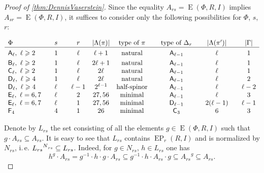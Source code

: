 \documentclass[oneside, 12pt]{amsart}
\theoremstyle{plain}
\numberwithin{equation}{section}
\numberwithin{lemma}{section}
\theoremstyle{definition}
\theoremstyle{remark}
\DeclareMathOperator{\E}{E}
\DeclareMathOperator{\EP}{EP}
\newcommand{\rA}{\mathsf{A}}
\newcommand{\rB}{\mathsf{B}}
\newcommand{\rC}{\mathsf{C}}
\newcommand{\rD}{\mathsf{D}}
\newcommand{\rE}{\mathsf{E}}
\newcommand{\rF}{\mathsf{F}}
\def\ssub#1{\mathchoice
   {_{\lower2pt\hbox{$\scriptstyle #1$}}}
   {_{\lower2pt\hbox{$\scriptstyle #1$}}}
   {_{\lower1.5pt\hbox{$\scriptscriptstyle #1$}}}
   {_{\!\lower1.5pt\hbox{$\scriptscriptstyle #1$}}}}
\begin{document}
\begin{proof}[Proof of \cref{thm:DennisVaserstein}]
Since the equality $A_{rs} = \E(\Phi, R, I)$ implies $A_{sr} = \E(\Phi, R, I)$, it suffices to consider only the following possibilities for $\Phi$, $s$, $r$:
\begin{table}[htb]
\[\begin{array}{l @{\qquad} l @{\qquad} c @{\quad} c @{\quad} c @{\qquad} c @{\qquad} c @{\qquad} c}
\Phi                                 & s    &r      & |\Lambda(\pi)| & \text{type of $\pi$} & \text{type of $\Delta_r$} & |\Lambda(\pi')|& |\Gamma|  \\ \hline\vphantom{\Bigl(}
\rA_\ell, \ \ell\geqslant 2           & 1    &\ell   & \ell+1         & \text{natural}       & \rA_{\ell-1}              & \ell           & 1  \\     
\rB_\ell, \ \ell\geqslant 2           & 1    &\ell   & 2\ell+1        & \text{natural}       & \rA_{\ell-1}              & \ell           & 1  \\     
\rC_\ell, \ \ell\geqslant 2           & 1    &\ell   & 2\ell          & \text{natural}       & \rA_{\ell-1}              & \ell           & 1  \\
\rD_\ell, \ \ell\geqslant 4           & 1    &\ell   & 2\ell          & \text{natural}       & \rA_{\ell-1}              & \ell           & 2  \\ 
\rD_\ell, \ \ell\geqslant 4           & \ell &\ell-1 & 2^{\ell-1}     & \text{half-spinor}   & \rA_{\ell-1}              & \ell           & \ell-2  \\
\rE_\ell, \ \ell=6, 7                  & \ell &2      & 27, 56         & \text{minimal}       & \rA_{\ell-1}              & \ell           & 3       \\ 
\rE_\ell, \ \ell=6, 7                  & \ell &1      & 27, 56         & \text{minimal}       & \rD_{\ell-1}              & 2(\ell-1)      & \ell-1  \\
\rF_4                                & 4    &1     & 26             & \text{minimal}       & \rC_3                     & 6              & 3\end{array}\]
 \caption{List of the cases considered in the proof of \cref{thm:DennisVaserstein}.} \label{table:dv-reps}
\end{table}

Denote by $L_{rs}$ the set consisting of all the elements $g\in \E(\Phi, R, I)$ such that $g \cdot A_{rs} \subseteq A_{rs}$.
It is easy to see that $L_{rs}$ contains $\EP_r(R, I)$ and is normalized by $N_{rs}$, i.\,e. ${L_{rs}}^{N\ssub{rs}}\subseteq L_{rs}$. Indeed, for $g\in N_{rs}$, $h\in L_{rs}$ one has
\begin{equation}\label{rel:NnormL} h^g \cdot A_{rs} = g^{-1} \cdot h \cdot g \cdot A_{rs} \subseteq g^{-1} \cdot h \cdot A_{rs} \cdot g \subseteq {A_{rs}}^g \subseteq A_{rs}.\end{equation}


\end{proof}
\end{document}
